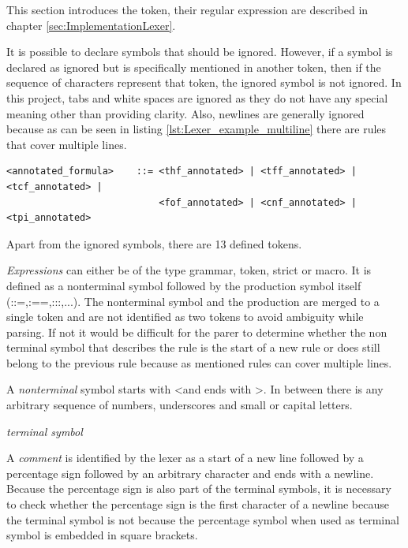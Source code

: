 This section introduces the token, their regular expression are described in chapter \ref{sec:ImplementationLexer}.

It is possible to declare symbols that should be ignored. However, if a symbol is declared as ignored but is specifically mentioned in another token,
then if the sequence of characters represent that token, the ignored symbol is not ignored. In this project, tabs and white spaces are ignored as they do not have any special meaning other than providing clarity. Also, newlines are generally ignored because as can be seen in listing \ref{lst:Lexer_example_multiline} there are rules that cover multiple lines. 

\begin{lstlisting}[basicstyle=\scriptsize	,caption= Example of a multi line production rule,label= lst:Lexer_example_multiline]
<annotated_formula>    ::= <thf_annotated> | <tff_annotated> | <tcf_annotated> |
                           <fof_annotated> | <cnf_annotated> | <tpi_annotated>
\end{lstlisting}

Apart from the ignored symbols, there are 13 defined tokens.

\textit{Expressions} can either be of the type grammar, token, strict or macro. 
It is defined as a nonterminal symbol followed by the production symbol itself (::=,:==,:::,...). 
The nonterminal symbol and the production are merged to a single token and are not identified as two
tokens to avoid ambiguity while parsing. If not it would be difficult for the parer to determine whether the non terminal symbol that describes the rule is the start of a new rule or does still belong to the previous rule because as mentioned rules can cover multiple lines.

A \textit{nonterminal} symbol starts with \textless and ends with \textgreater . In between there is any
arbitrary sequence of numbers, underscores and small or capital letters.

\textit{terminal symbol}

A \textit{comment} is identified by the lexer as a start of a new line followed by a percentage
sign followed by an arbitrary character and ends with a newline. Because the
percentage sign is also part of the terminal symbols, it is necessary to check whether
the percentage sign is the first character of a newline because the terminal symbol is not because the
percentage symbol when used as terminal symbol is embedded in square brackets.

